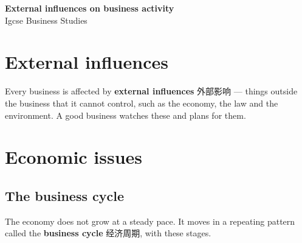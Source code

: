 \documentclass[11pt]{article}
\begin{document}
\begin{center}
  {\LARGE\bfseries External influences on business activity}\\[0.35em]
  {\large Igcse Business Studies}
\end{center}
\vspace{0.6em}

\section*{External influences}

Every business is affected by \textbf{external influences} 外部影响 — things outside the business that it cannot control, such as the economy, the law and the environment. A good business watches these and plans for them.

\section*{Economic issues}

\subsection*{The business cycle}

The economy does not grow at a steady pace. It moves in a repeating pattern called the \textbf{business cycle} 经济周期, with these stages.

\begin{center}
\end{center}
\end{document}
